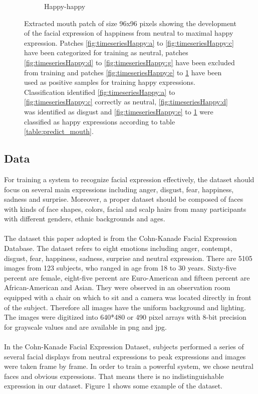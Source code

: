 \begin{figure}[H]
\begin{subfigure}[b]{0.15\textwidth}
		\caption{Happy-happy}
		\label{fig:timeseriesHappy:m}
	\end{subfigure}
	\caption{Extracted mouth patch of size 96x96 pixels showing the development of
	the facial expression of happiness from neutral to maximal happy expression.
	Patches \ref{fig:timeseriesHappy:a} to \ref{fig:timeseriesHappy:c} have been
	categorized for training as neutral, patches \ref{fig:timeseriesHappy:d} to
	\ref{fig:timeseriesHappy:g} have been excluded from training and patches
	\ref{fig:timeseriesHappy:e} to \ref{fig:timeseriesHappy:m} have been used as
	positive samples for training happy expressions. Classification identified
	\ref{fig:timeseriesHappy:a} to \ref{fig:timeseriesHappy:c} correctly as
	neutral, \ref{fig:timeseriesHappy:d} was identified as disgust and
	\ref{fig:timeseriesHappy:e} to \ref{fig:timeseriesHappy:m} were classified as
	happy expressions according to table \ref{table:predict_mouth}.}
	\label{fig:timeseriesHappy}
\end{figure}

\subsection{Data}
For training a system to recognize facial expression effectively, the dataset should focus on several main expressions including anger, disgust, fear, happiness, sadness and surprise. Moreover, a proper dataset should be composed of faces with kinds of face shapes, colors, facial and scalp hairs from many participants with different genders, ethnic backgrounds and ages. 
\\
\\
The dataset this paper adopted is from the Cohn-Kanade Facial Expression Database. The dataset refers to eight emotions including anger, contempt, disgust, fear, happiness, sadness, surprise and neutral expression. There are 5105 images from 123 subjects, who ranged in age from 18 to 30 years. Sixty-five percent are female, eight-five percent are Euro-American and fifteen percent are African-American and Asian. They were observed in an observation room equipped with a chair on which to sit and a camera was located directly in front of the subject. Therefore all images have the uniform background and lighting. The images were digitized into 640*480 or 490 pixel arrays with 8-bit precision for grayscale values and are available in png and jpg. 
\\
\\
In the Cohn-Kanade Facial Expression Dataset, subjects performed a series of several facial displays from neutral expressions to peak expressions and images were taken frame by frame. In order to train a powerful system, we chose neutral faces and obvious expressions. That means there is no indistinguishable expression in our dataset. Figure 1 shows some example of the dataset.



